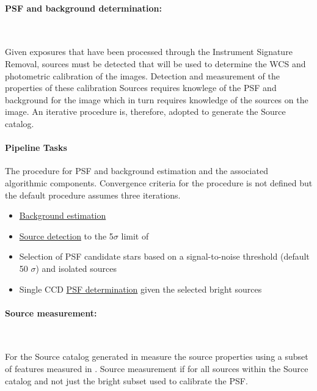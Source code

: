 \paragraph{PSF and background determination:}~
\label{sec:apPSFBackground}

Given exposures that have been processed through the Instrument Signature Removal, sources must be detected that will be used to determine the WCS and photometric calibration of the images. Detection and measurement of the properties of these calibration Sources requires knowlege of the PSF and background for the image which in turn requires knowledge of the sources on the image. An iterative procedure is, therefore, adopted to generate the Source catalog. 

\paragraph{Pipeline Tasks}
The procedure for PSF and background estimation and the associated
algorithmic components. Convergence criteria for the procedure is not
defined but the default procedure assumes three iterations.
\begin{itemize}
\item \hyperref[sec:acBackgroundEstimation]{Background estimation}
\item \hyperref[sec:acSourceDetection]{Source detection} to the 5$\sigma$ limit of
\item Selection of PSF candidate stars based on a signal-to-noise threshold 
  (default 50 $\sigma$) and isolated sources 
\item Single CCD \hyperref[sec:acSingleCCDPSF]{PSF determination} given the selected bright sources
\end{itemize}


\paragraph{Source measurement:}~
\label{sec:apSourcemeasurement}

For the Source catalog generated in \label{sec:apPSFBackground} measure the source properties using a subset of features measured in \label{sec:drpMeasureSources}. Source measurement if for all sources within the Source catalog and not just the bright subset used to calibrate the PSF. 

